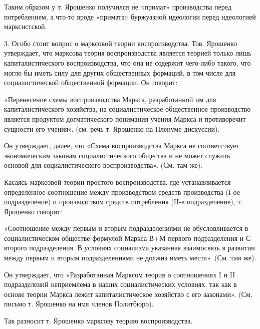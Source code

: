 \documentclass[12pt, a4paper, openany]{book}
\begin{document}
Таким образом у т. Ярошенко получился не «примат» производства перед потреблением, а что-то вроде «примата» буржуазной идеологии перед идеологией марксистской.



3. Особо стоит вопрос о марксовой теории воспроизводства. Тов. Ярошенко утверждает, что марксова теория воспроизводства является теорией только лишь капиталистического воспроизводства, что она не содержит чего-либо такого, что могло бы иметь силу для других общественных формаций, в том числе для социалистической общественной формации. Он говорит:



«Перенесение схемы воспроизводства Маркса, разработанной им для капиталистического хозяйства, на социалистическое общественное производство является продуктом догматического понимания учения Маркса и противоречит сущности его учения». (см. речь т. Ярошенко на Пленуме дискуссии).



Он утверждает, далее, что «Схема воспроизводства Маркса не соответствует экономическим законам социалистического общества и не может служить основой для социалистического воспроизводства». (См. там же).



Касаясь марксовой теории простого воспроизводства, где устанавливается определённое соотношение между производством средств производства (I-ое подразделение) и производством средств потребления (II-е подразделение), т. Ярошенко говорит:



«Соотношение между первым и вторым подразделениями не обусловливается в социалистическом обществе формулой Маркса В+М первого подразделения и С второго подразделения. В условиях социализма указанная взаимосвязь в развитии между первым и вторым подразделениями не должна иметь места». (См. там же).



Он утверждает, что «Разработанная Марксом теория о соотношениях I и II подразделений неприемлема в наших социалистических условиях, так как в основе теории Маркса лежит капиталистическое хозяйство с его законами». (См. письмо т. Ярошенко на имя членов Политбюро).



Так разносит т. Ярошенко марксову теорию воспроизводства.
\end{document}

